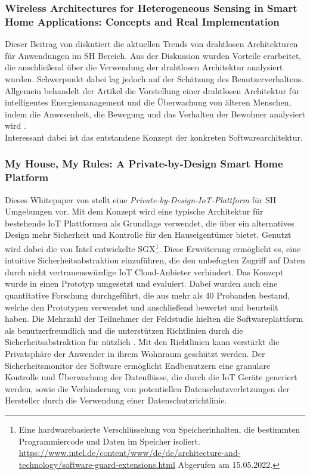         \subsubsection*{Wireless Architectures for Heterogeneous Sensing in Smart Home Applications: Concepts and Real Implementation}
            Dieser Beitrag von \cite{Viani2013} diskutiert die aktuellen Trends von drahtlosen Architekturen für Anwendungen 
            im \acl{SH} Bereich. Aus der Diskussion wurden Vorteile erarbeitet, die anschließend über die Verwendung der 
            drahtlosen Architektur analysiert wurden. Schwerpunkt dabei lag jedoch auf der Schätzung des Benutzerverhaltens. 
            \\
            \linebreak
            Allgemein behandelt der Artikel die Vorstellung einer drahtlosen Architektur für intelligentes Energiemanagement 
            und die Überwachung von älteren Menschen, indem die Anwesenheit, die Bewegung und das Verhalten der Bewohner 
            analysiert wird \cite{Viani2013}. 
            \\
            Interessant dabei ist das entstandene Konzept der konkreten Softwarearchitektur.

        \subsubsection*{My House, My Rules: A Private-by-Design Smart Home Platform}
            Dieses Whitepaper von \cite{Zavalyshyn2020} stellt eine \textit{Private-by-Design-IoT-Plattform} für \acl{SH} 
            Umgebungen vor. Mit dem Konzept wird eine typische Architektur für bestehende \acs{IoT} Plattformen als Grundlage 
            verwendet, die über ein alternatives Design mehr Sicherheit und Kontrolle für den Hauseigentümer bietet. 
            Genutzt wird dabei die von Intel entwickelte \ac{SGX}\footnote{Eine hardwarebasierte Verschlüsselung von Speicherinhalten, die bestimmten Programmiercode und Daten im Speicher isoliert. \url{https://www.intel.de/content/www/de/de/architecture-and-technology/software-guard-extensions.html} Abgerufen am 15.05.2022.}. 
            Diese Erweiterung ermöglicht es, eine intuitive Sicherheitsabstraktion einzuführen, die den unbefugten Zugriff auf Daten 
            durch nicht vertrauenswürdige \acs{IoT} Cloud-Anbieter verhindert. Das Konzept wurde in einen Prototyp umgesetzt und 
            evaluiert. Dabei wurden auch eine quantitative Forschung durchgeführt, die aus mehr als 40 Probanden bestand, welche 
            den Prototypen verwendet und anschließend bewertet und beurteilt haben. Die Mehrzahl der Teilnehmer der Feldstudie 
            hielten die Softwareplattform als benutzerfreundlich und die unterstützen Richtlinien durch die Sicherheitsabstraktion 
            für nützlich \cite{Zavalyshyn2020}. Mit den Richtlinien kann verstärkt die Privatsphäre der Anwender in ihrem Wohnraum 
            geschützt werden. Der Sicherheitsmonitor der Software ermöglicht Endbenutzern eine granulare Kontrolle und Überwachung 
            der Datenflüsse, die durch die \acs{IoT} Geräte generiert werden, sowie die Verhinderung von potentiellen 
            Datenschutzverletzungen der Hersteller durch die Verwendung einer Datenschutzrichtlinie. 

